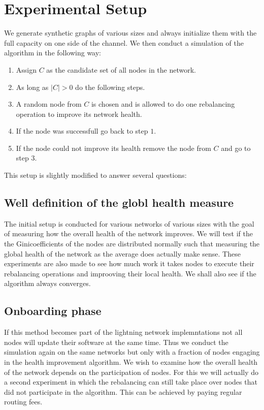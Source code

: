 \documentclass[a4paper]{paper}
\begin{document}

\section{Experimental Setup}
We generate synthetic graphs of various sizes and always initialize them with the full capacity on one side of the channel.
We then conduct a simulation of the algorithm in the following way:
\begin{enumerate}
\item Assign $C$ as the candidate set of all nodes in the network.
\item As long as $|C| > 0$ do the following steps.
\item A random node from $C$ is chosen and is allowed to do one rebalancing operation to improve its network health.
\item If the node was successfull go back to step $1$.
\item If the node could not improve its health remove the node from $C$ and go to step $3$.
\end{enumerate}

This setup is slightly modified to answer several questions:

\subsection{Well definition of the globl health measure}
The initial setup is conducted for various networks of various sizes with the goal of measuring how the overall health of the network improves.
We will test if the the Ginicoefficients of the nodes are distributed normally such that measuring the global health of the network as the average does actually make sense.
These experiments are also made to see how much work it takes nodes to execute their rebalancing operations and improoving their local health.
We shall also see if the algorithm always converges.

\subsection{Onboarding phase}
If this method becomes part of the lightning network implemntations not all nodes will update their software at the same time.
Thus we conduct the simulation again on the same networks but only with a fraction of nodes engaging in the health improvement algorithm.
We wish to examine how the overall health of the network depends on the participation of nodes.
For this we will actually do a second experiment in which the rebalancing can still take place over nodes that did not participate in the algorithm.
This can be achieved by paying regular routing fees.
\end{document}
